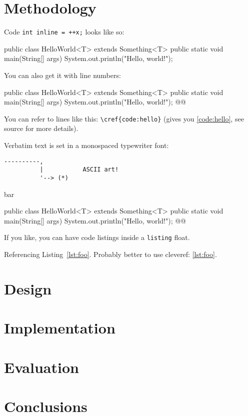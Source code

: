 \documentclass[11pt,titlepage,openright]{book}
\makeatletter
\renewenvironment{listing*}[1][]{%
  \begin{listing}[#1]%
    \checkoddpage%
    \ifoddpage%
      \begin{adjustwidth}{0cm}{-45mm}%
    \else%
      \begin{adjustwidth}{-45mm}{0cm}%
    \fi%
    }{%
    \end{adjustwidth}%
  \end{listing}}
\renewcommand{\c}[1]{\lstinline[style=std]@#1@}
\makeatother
\begin{document}
\chapter{Methodology}
\lipsum[1] Code \c{int inline = ++x;} looks like so:

\begin{Code}
public class HelloWorld<T> extends Something<T> {
  public static void main(String[] args) {
    System.out.println("Hello, world!");
  }
}
\end{Code}

You can also get it with line numbers:

\begin{Code_Numbered}
public class HelloWorld<T> extends Something<T> {
  public static void main(String[] args) {
    System.out.println("Hello, world!"); @\label{code:hello}@
  }
}
\end{Code_Numbered}


You can refer to lines like this: \verb+\cref{code:hello}+ (gives you \cref{code:hello}, see source for more details).

Verbatim text is set in a monospaced typewriter font:

\begin{verbatim}
----------,
          |           ASCII art!
          '--> (*)
\end{verbatim}

\lipsum[2-4]

\begin{table}[!h]
  \caption{bar}
  \label{tab:bar}
\end{table}

\begin{listing*}[t]
\begin{Code_Numbered}
public class HelloWorld<T> extends Something<T> {
  public static void main(String[] args) {
    System.out.println("Hello, world!"); @\label{code:hello}@
  }
}
\end{Code_Numbered}
\caption{If you like, you can have code listings inside a \c{listing} float.}
\label{lst:foo}
\end{listing*}

Referencing Listing~\ref{lst:foo}.
Probably better to use cleveref: \cref{lst:foo}.

\chapter{Design}
\lipsum

\chapter{Implementation}
\lipsum

\chapter{Evaluation}
\lipsum

\chapter{Conclusions}
\lipsum



\end{document}
